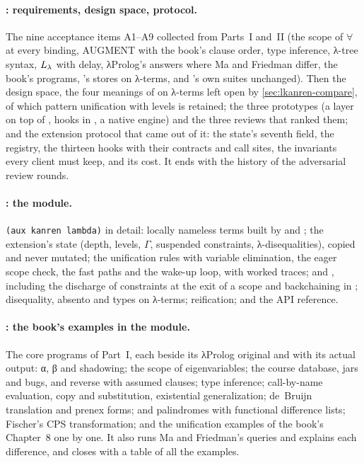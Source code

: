 \paragraph{: requirements, design space, protocol.} The nine acceptance items A1--A9
collected from Parts~I and~II (the scope of $\forall$ at every binding, AUGMENT with the book's clause
order, type inference, λ-tree syntax, $L_\lambda$ with delay, λProlog's answers where Ma and Friedman differ,
the book's programs, \micro's stores on λ-terms, and \micro's own suites unchanged). Then the design space,
the four meanings of  on λ-terms left open by \cref{sec:lkanren-compare}, of which pattern
unification with levels is retained; the three prototypes (a layer on top of \micro, hooks in \micro, a
native engine) and the three reviews that ranked them; and the extension protocol that came out of it:
the state's seventh field, the registry, the thirteen hooks with their contracts and call sites, the
invariants every client must keep, and its cost. It ends with the history of the adversarial review rounds.

\paragraph{: the module.} \texttt{(aux kanren lambda)} in detail: locally nameless terms
built by  and ; the extension's state (depth, levels, $\Gamma$, suspended constraints,
λ-disequalities), copied and never mutated; the unification rules with variable elimination, the eager
scope check, the fast paths and the wake-up loop, with worked traces;  and , including
the discharge of constraints at the exit of a scope and backchaining in ;
disequality, absento and types on λ-terms; reification; and the API reference.

\paragraph{: the book's examples in the module.} The core programs of Part~I, each beside its
λProlog original and with its actual output: α, β and shadowing; the scope of eigenvariables; the course
database, jars and bugs, and reverse with assumed clauses; type inference; call-by-name evaluation, copy and
substitution, existential generalization; de~Bruijn translation and prenex forms;  and
palindromes with functional difference lists; Fischer's CPS transformation; and the unification examples of
the book's Chapter~8 one by one. It also runs Ma and Friedman's queries and explains each difference, and
closes with a table of all the examples.

